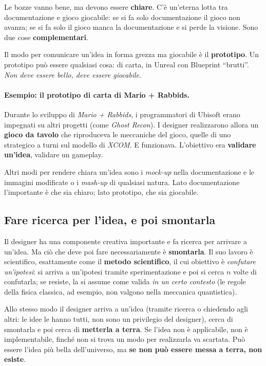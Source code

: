 Le bozze vanno bene, ma devono essere \textbf{chiare}. C'è un'eterna lotta tra
documentazione e gioco giocabile: se si fa solo documentazione il gioco non
avanza; se si fa solo il gioco manca la documentazione e si perde la visione.
Sono due cose \textbf{complementari}.

Il modo per comunicare un'idea in forma grezza ma giocabile è il
\textbf{prototipo}. Un prototipo può essere qualsiasi cosa: di carta, in
Unreal con Blueprint ``brutti''. \emph{Non deve essere bello, deve essere
giocabile}.

\paragraph{Esempio: il prototipo di carta di Mario + Rabbids.} Durante lo
sviluppo di \emph{Mario + Rabbids}, i programmatori di Ubisoft erano impegnati
su altri progetti (come \emph{Ghost Recon}). I designer realizzarono allora
un \textbf{gioco da tavolo} che riproduceva le meccaniche del gioco, quelle
di uno strategico a turni sul modello di \emph{XCOM}. E funzionava.
L'obiettivo era \textbf{validare un'idea}, validare un gameplay.

Altri modi per rendere chiara un'idea sono i \emph{mock-up} nella
documentazione e le immagini modificate o i \emph{mash-up} di qualsiasi
natura. Lato documentazione l'importante è che sia chiaro; lato prototipo,
che sia giocabile.

\subsection{Fare ricerca per l'idea, e poi smontarla}

Il designer ha una componente creativa importante e fa ricerca per arrivare a
un'idea. Ma ciò che deve poi fare necessariamente è \textbf{smontarla}. Il
suo lavoro è scientifico, esattamente come il \textbf{metodo scientifico}, il
cui obiettivo è \emph{confutare un'ipotesi}: si arriva a un'ipotesi tramite
sperimentazione e poi si cerca $n$ volte di confutarla; se resiste, la si
assume come valida \emph{in un certo contesto} (le regole della fisica
classica, ad esempio, non valgono nella meccanica quantistica).

Allo stesso modo il designer arriva a un'idea (tramite ricerca o chiedendo
agli altri: le idee le hanno tutti, non sono un privilegio del designer),
cerca di smontarla e poi cerca di \textbf{metterla a terra}. Se l'idea non è
applicabile, non è implementabile, finché non si trova un modo per
realizzarla va scartata. Può essere l'idea più bella dell'universo, ma
\textbf{se non può essere messa a terra, non esiste}.

